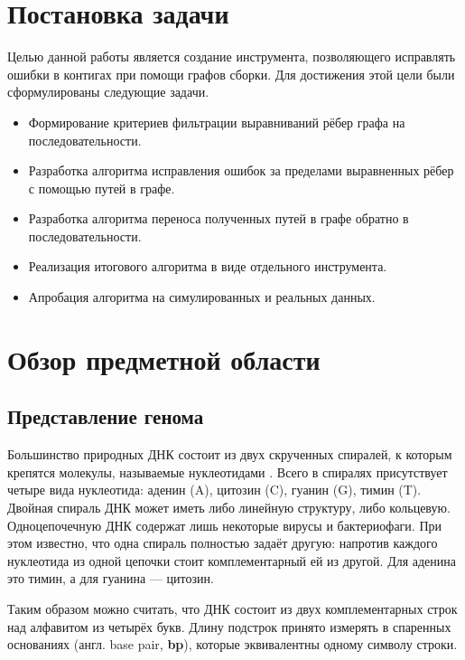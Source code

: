 \documentclass[14pt]{matmex-diploma-custom}
\begin{document}
\section{Постановка задачи}
Целью данной работы является создание инструмента, позволяющего исправлять ошибки в контигах при помощи графов сборки. Для достижения этой цели были сформулированы следующие задачи.
\begin{itemize}
    \item Формирование критериев фильтрации выравниваний рёбер графа на последовательности.
    \item Разработка алгоритма исправления ошибок за пределами выравненных рёбер с помощью путей в графе.
    \item Разработка алгоритма переноса полученных путей в графе обратно в последовательности.
    \item Реализация итогового алгоритма в виде отдельного инструмента.
    \item Апробация алгоритма на симулированных и реальных данных.
\end{itemize}

\section{Обзор предметной области}
\subsection{Представление генома}
Большинство природных ДНК состоит из двух скрученных спиралей, к которым крепятся молекулы, называемые нуклеотидами \cite{art:Watson}. Всего в спиралях присутствует четыре вида нуклеотида: аденин (A), цитозин (C), гуанин (G), тимин (T). Двойная спираль ДНК может иметь либо линейную структуру, либо кольцевую. Одноцепочечную ДНК содержат лишь некоторые вирусы и бактериофаги. При этом известно, что одна спираль полностью задаёт другую: напротив каждого нуклеотида из одной цепочки стоит комплементарный ей из другой. Для аденина это тимин, а для гуанина --- цитозин.

Таким образом можно считать, что ДНК состоит из двух комплементарных строк над алфавитом из четырёх букв. Длину подстрок принято измерять в спаренных основаниях (англ. base pair, \textbf{bp}), которые эквивалентны одному символу строки.
\end{document}
